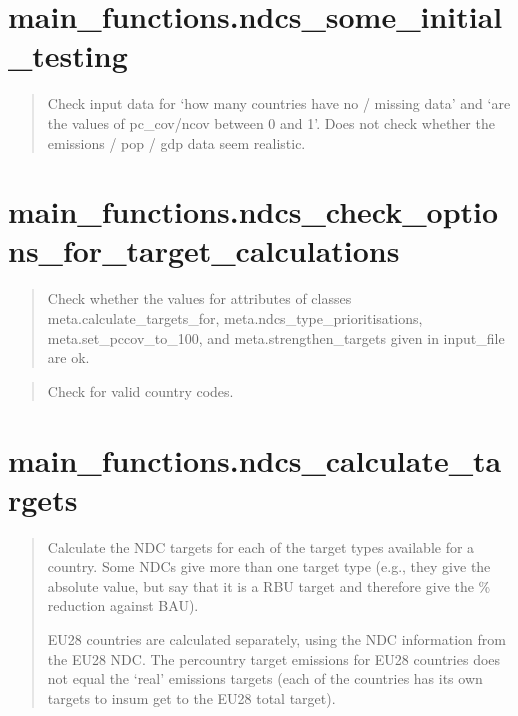 \documentclass[letterpaper,10pt,english]{sphinxmanual}
\begin{document}
\chapter{main\_functions.ndcs\_some\_initial\_testing}
\label{\detokenize{code:main-functions-ndcs-some-initial-testing}}
\begin{quote}

Check input data for ‘how many countries have no / missing data’ and ‘are the values of pc\_cov/ncov between 0 and 1’.
Does not check whether the emissions / pop / gdp data seem realistic.
\end{quote}


\chapter{main\_functions.ndcs\_check\_options\_for\_target\_calculations}
\label{\detokenize{code:main-functions-ndcs-check-options-for-target-calculations}}
\begin{quote}

Check whether the values for attributes of classes meta.calculate\_targets\_for, meta.ndcs\_type\_prioritisations,
meta.set\_pccov\_to\_100, and meta.strengthen\_targets \textendash{} given in input\_file \textendash{} are ok.
\end{quote}

\begin{quote}

Check for valid country codes.
\end{quote}


\chapter{main\_functions.ndcs\_calculate\_targets}
\label{\detokenize{code:main-functions-ndcs-calculate-targets}}
\begin{quote}

Calculate the NDC targets for each of the target types available for a country.
Some NDCs give more than one target type (e.g., they give the absolute value,
but say that it is a RBU target and therefore give the \% reduction against BAU).

EU28 countries are calculated separately, using the NDC information from the EU28 NDC.
The per\sphinxhyphen{}country target emissions for EU28 countries does not equal the ‘real’ emissions targets
(each of the countries has its own targets to in\sphinxhyphen{}sum get to the EU28 total target).
\end{quote}
\end{document}
